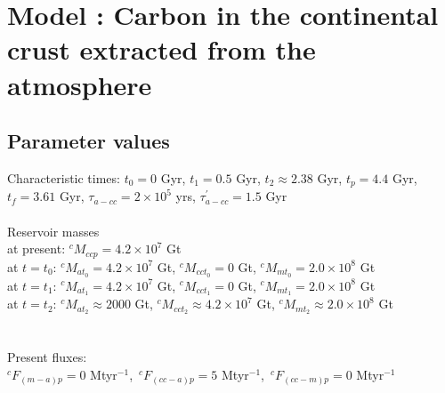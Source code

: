 \documentclass[14pt]{article}
\date{}
\begin{document}
\section*{Model : Carbon in the continental crust extracted from the atmosphere}
\thispagestyle{empty}

\subsection*{Parameter values}

Characteristic times: 
$t_0 = 0$ Gyr, $t_1 = 0.5$ Gyr, $t_2 \approx 2.38$ Gyr, $t_p = 4.4$ Gyr, $t_f = 3.61$ Gyr, $\tau_{a-cc} = 2 \times 10^5$ yrs, $\tau^{'}_{a-cc} = 1.5$ Gyr
 \\ \\
\noindent Reservoir masses \\
at present: $^cM_{ccp} = 4.2 \times 10^7$ Gt \\
at $t = t_0$: $^cM_{at_{0}} = 4.2 \times 10^7$ Gt, $^cM_{cct_{0}} = 0$ Gt, $^cM_{mt_{0}} = 2.0 \times 10^8$ Gt \\
at $t = t_1$: $^cM_{at_{1}} = 4.2 \times 10^7$ Gt, $^cM_{cct_{1}} = 0$ Gt, $^cM_{mt_{1}} = 2.0 \times 10^8$ Gt \\
at $t = t_2$: $^cM_{at_{2}} \approx 2000$ Gt, $^cM_{cct_{2}} \approx 4.2 \times 10^7$ Gt, $^cM_{mt_{2}} \approx 2.0 \times 10^8$ Gt \\
\\ \\
\noindent Present fluxes: \\
$^cF_{(m-a)p} = 0$ Mtyr$^{-1}$, $\,^cF_{(cc-a)p} = 5$ Mtyr$^{-1}$, $\,^cF_{(cc-m)p} = 0$ Mtyr$^{-1}$
\end{document}
